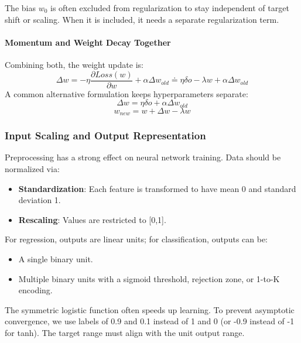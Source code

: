 The bias $w_0$ is often excluded from regularization to stay independent of target shift or scaling. When it is included, it needs a separate regularization term.

\paragraph{Momentum and Weight Decay Together}

Combining both, the weight update is:
\begin{equation*}
    \Delta w = -\eta \dfrac{\partial Loss(w)}{\partial w} + \alpha \Delta w_{old} \doteq \eta \delta o - \lambda w + \alpha \Delta w_{old}
\end{equation*}
A common alternative formulation keeps hyperparameters separate:
\begin{equation*}
    \Delta w = \eta \delta o + \alpha \Delta w_{old}
\end{equation*}
\begin{equation*}
    w_{new} = w + \Delta w - \lambda w
\end{equation*}

\subsubsection{Input Scaling and Output Representation}
Preprocessing has a strong effect on neural network training. Data should be normalized via:

\begin{itemize}
    \item \textbf{Standardization}: Each feature is transformed to have mean 0 and standard deviation 1.
    \item \textbf{Rescaling}: Values are restricted to [0,1].
\end{itemize}

For regression, outputs are linear units; for classification, outputs can be:

\begin{itemize}
    \item A single binary unit.
    \item Multiple binary units with a sigmoid threshold, rejection zone, or 1-to-K encoding.
\end{itemize}

The symmetric logistic function often speeds up learning. To prevent asymptotic convergence, we use labels of 0.9 and 0.1 instead of 1 and 0 (or -0.9 instead of -1 for tanh). The target range must align with the unit output range.

